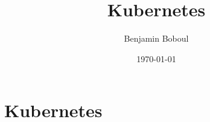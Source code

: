 \documentclass[../../csnotes.tex]{subfile}
\title{Kubernetes}
\author{Benjamin Boboul}
\date{\today}
\begin{document}
\maketitle{}

\chapter{Kubernetes}
\end{document}
